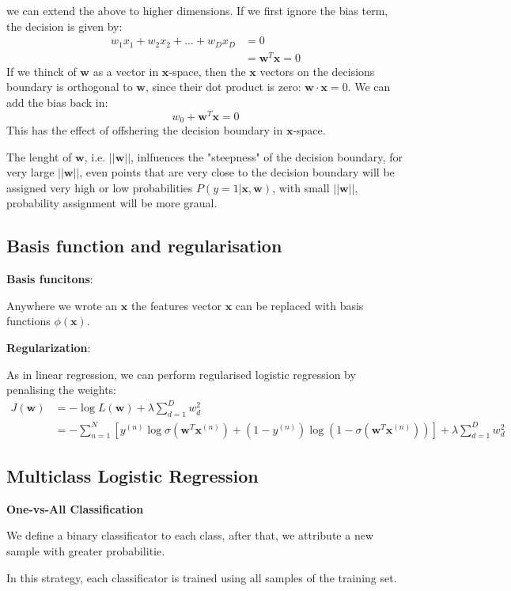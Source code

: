 \documentclass[a4paper, 11pt]{article}
\begin{document}
we can extend the above to higher dimensions. If we first ignore the bias term, the decision is given by:
\begin{align*}
        w_1x_1 + w_2x_2 + \dots + w_Dx_D &= 0\\
        &=\mathbf{w}^{T}\mathbf{x} = 0
\end{align*}
If we thinck of $\mathbf{w}$ as a vector in $\mathbf{x}$-space, then the $\mathbf{x}$ vectors on the decisions boundary is
orthogonal to $\mathbf{w}$, since their dot product is zero: $\mathbf{w}\cdot\mathbf{x} = 0$. We can add the bias back in:
\begin{equation}
        w_0 + \mathbf{w}^{T}\mathbf{x} = 0
\end{equation}
This has the effect of offshering the decision boundary in $\mathbf{x}$-space.

The lenght of $\mathbf{w}$, i.e. $||\mathbf{w}||$, inlfuences the "steepness" of the decision boundary, for very large $||\mathbf{w}||$, even points that are very
close to the decision boundary will be assigned very high or low probabilities $P(y = 1|\mathbf{x}, \mathbf{w})$, with small $||\mathbf{w}||$, probability assignment will be more graual.

\subsection{Basis function and regularisation}
\textbf{Basis funcitons}:

Anywhere we wrote an $\mathbf{x}$ the features vector $\mathbf{x}$ can be replaced with basis functions $\phi(\mathbf{x})$.

\textbf{Regularization}:

As in linear regression, we can perform regularised logistic regression by penalising the weights:
\begin{align*}
        J(\mathbf{w}) &= -\log{L(\mathbf{w})} + \lambda\sum\limits_{d = 1}^{D}w_{d}^{2}\\
        &= - \sum\limits_{n = 1}^{N}[y^{(n)}\log{\sigma(\mathbf{w}^{T}\mathbf{x}^{(n)})} + (1 - y^{(n)})\log{(1 - \sigma(\mathbf{w}^{T}\mathbf{x}^{(n)}))}] + \lambda\sum\limits_{d = 1}^{D} w_{d}^{2}
\end{align*}

\subsection{Multiclass Logistic Regression}
{\Large\textbf{One-vs-All Classification}}

We define a binary classificator to each class, after that, we attribute a new sample with greater probabilitie.

In this strategy, each classificator is trained using all samples of the training set.
\end{document}
